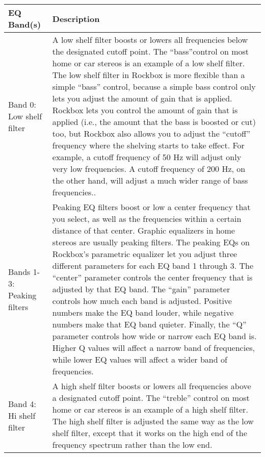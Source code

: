 {  \begin{table}
  \begin{center}
  \begin{tabularx}{\textwidth}{lX}\toprule
      \textbf{EQ Band(s)} & \textbf{Description} \\\midrule
        Band 0:  Low shelf filter
        & A low shelf filter boosts or lowers all frequencies below the 
        	designated cutoff point. The ``bass''control on most home or car 
        	stereos is an example of a low shelf filter. The low shelf 
        	filter in Rockbox is more flexible than a simple ``bass'' 
        	control, because a simple bass control only lets you adjust 
        	the amount of gain that is applied. Rockbox lets you control 
        	the amount of gain that is applied (i.e., the amount that the 
        	bass is boosted or cut) too, but Rockbox also allows you to 
        	adjust the ``cutoff'' frequency where the shelving starts to take 
        	effect. For example, a cutoff frequency of 50 Hz will adjust only very 
        	low frequencies. A cutoff frequency of 200 Hz, on the other hand, will 
        	adjust a much wider range of bass frequencies.. \\
        Bands 1-3:  Peaking filters
       	& Peaking EQ filters boost or low a center frequency that you select, 
       		as well as the frequencies within a certain distance of that 
       		center. Graphic equalizers in home stereos are usually peaking
       		filters. The peaking EQs on Rockbox's parametric equalizer let
       		you adjust three different parameters for each EQ band 1 
       		through 3.  The ``center'' parameter controls the center 
       		frequency that is adjusted by that EQ band. The ``gain'' 
       		parameter controls how much each band is adjusted. Positive 
       		numbers make the EQ band louder, while negative numbers make 
       		that EQ band quieter. Finally, the ``Q'' parameter controls how wide 
       		or narrow each EQ band is. Higher Q values will affect a 
       		narrow band of frequencies, while lower EQ values will affect 
       		a wider band of frequencies. \\
        Band 4:  Hi shelf filter
       	& A high shelf filter boosts or lowers all frequencies above a 
        	designated cutoff point. The ``treble'' control on most home or car 
        	stereos is an example of a high shelf filter. The high shelf filter is 
        	adjusted the same way as the low shelf filter, except that it works on 
        	the high end of the frequency spectrum rather than the low end.\\
        \bottomrule
  \end{tabularx}
  \end{center}
  \end{table}
   
}
